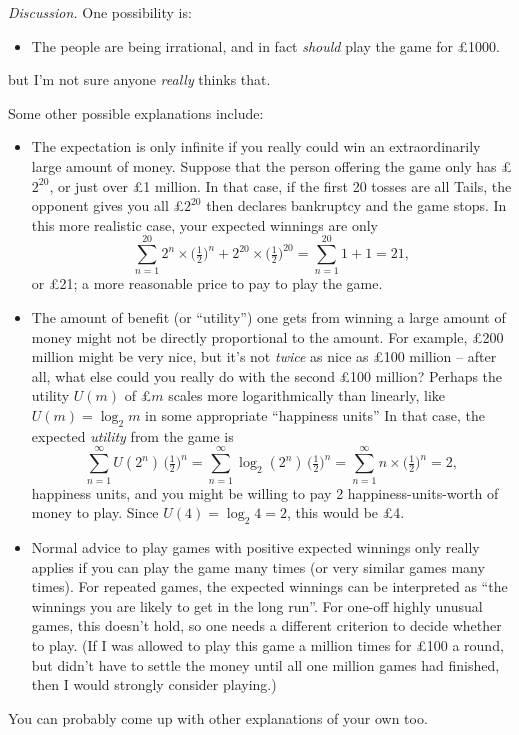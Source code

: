 \documentclass[
  a4paper,
]{book}
\providecommand{\tightlist}{%
  \setlength{\itemsep}{0pt}\setlength{\parskip}{0pt}}
\theoremstyle{definition}
\theoremstyle{definition}
\theoremstyle{definition}
\theoremstyle{definition}
\theoremstyle{remark}
\begin{document}
\begin{myanswers}
\emph{Discussion.}
One possibility is:

\begin{itemize}
\tightlist
\item
  The people are being irrational, and in fact \emph{should} play the game for £1000.
\end{itemize}

but I'm not sure anyone \emph{really} thinks that.

Some other possible explanations include:

\begin{itemize}
\item
  The expectation is only infinite if you really could win an extraordinarily large amount of money. Suppose that the person offering the game only has £\(2^{20}\), or just over £1 million. In that case, if the first 20 tosses are all Tails, the opponent gives you all £\(2^{20}\) then declares bankruptcy and the game stops. In this more realistic case, your expected winnings are only
  \[  \sum_{n=1}^{20} 2^n \times \big(\tfrac12\big)^n + 2^{20} \times \big(\tfrac12\big)^{20} = \sum_{n=1}^{20} 1 + 1 = 21 , \]
  or £21; a more reasonable price to pay to play the game.
\item
  The amount of benefit (or ``utility'') one gets from winning a large amount of money might not be directly proportional to the amount. For example, £200 million might be very nice, but it's not \emph{twice} as nice as £100 million -- after all, what else could you really do with the second £100 million? Perhaps the utility \(U(m)\) of £\(m\) scales more logarithmically than linearly, like \(U(m) = \log_2 m\) in some appropriate ``happiness units'' In that case, the expected \emph{utility} from the game is
  \[ \sum_{n=1}^\infty U(2^n) \, \big(\tfrac12\big)^n = \sum_{n=1}^\infty \log_2(2^n) \, \big(\tfrac12\big)^n = \sum_{n=1}^\infty n \times \big(\tfrac12\big)^n = 2 , \]
  happiness units, and you might be willing to pay 2 happiness-units-worth of money to play. Since \(U(4) = \log_2 4 = 2\), this would be £4.
\item
  Normal advice to play games with positive expected winnings only really applies if you can play the game many times (or very similar games many times). For repeated games, the expected winnings can be interpreted as ``the winnings you are likely to get in the long run''. For one-off highly unusual games, this doesn't hold, so one needs a different criterion to decide whether to play. (If I was allowed to play this game a million times for £100 a round, but didn't have to settle the money until all one million games had finished, then I would strongly consider playing.)
\end{itemize}

You can probably come up with other explanations of your own too.

\end{myanswers}
\end{document}
